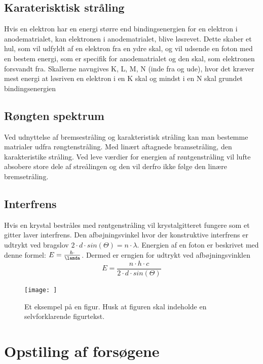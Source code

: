\documentclass[a4paper,twoside]{article}
\begin{document}
\subsection{Karaterisktisk stråling}
Hvis en elektron har en energi større end bindingsenergien for en elektron i anodematrialet, kan elektronen i anodematrialet, blive løsrevet. Dette skaber et hul, som vil udfyldt af en elektron fra en ydre skal, og vil udsende en foton med en bestem energi, som er specifik for anodematrialet og den skal, som elektronen forsvandt fra. Skallerne navngives K, L, M, N (inde fra og ude), hvor det kræver mest energi at løsriven en elektron i en K skal og mindst i en N skal grundet bindingsenergien

\subsection{Røngten spektrum}
Ved udnyttelse af bremsestråling og karakteristisk stråling kan man bestemme matrialer udfra røngtenstråling. Med linært aftagnede bramsetråling, den karakteristike stråling. Ved leve værdier for energien af røntgenstråling vil lufte absobere store dele af streålingen og den vil derfro ikke følge den linære bremsetråling.

\subsection{Interfrens}
Hvis en krystal bestråles med røntgenstråling vil krystalgitteret fungere som et gitter laver interfrens. Den afbøjningsvinkel hvor der konstruktive interfrens er udtrykt ved bragslov $2\cdot d \cdot sin(\Theta)=n\cdot \lambda$. Energien af en foton er beskrivet med denne formel: $E=\frac{h\cdot}{\lamda}$. Dermed er erngien for udtrykt ved afbøjningsvinklen 
\begin{equation}
    E=\frac{n\cdot h\cdot c}{2\cdot d\cdot sin(\Theta)}
\end{equation}



\begin{figure}
\begin{centering}
\texttt{[image: ]}
\par\end{centering}
\caption{\label{cap:nerd_sniping}Et eksempel på en figur. Husk at figuren skal indeholde en selvforklarende figurtekst.}
\end{figure}

\section{Opstiling af forsøgene}
\end{document}
